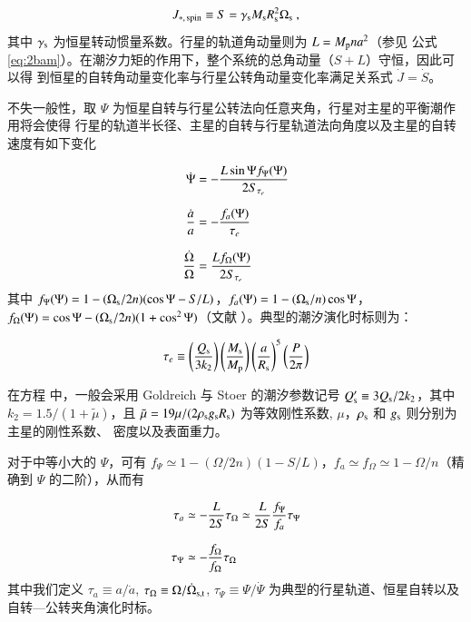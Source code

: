 \begin{equation} \label{eq:spinam}
J_{*,\,\mathrm{spin}} \equiv S = \gamma_\mathrm{s} M_\mathrm{s} R_\mathrm{s}^2 \Omega_\mathrm{s} \ ,
\end{equation} %
其中 $\gamma_\mathrm{s}$ 为恒星转动惯量系数。行星的轨道角动量则为 $L = M_\mathrm{p}na^2$（参见
公式 \ref{eq:2bam}）。在潮汐力矩的作用下，整个系统的总角动量（$S+L$）守恒，因此可以得
到恒星的自转角动量变化率与行星公转角动量变化率满足关系式 $\dot{J} = \dot{S}$。

不失一般性，取 $\Psi$ 为恒星自转与行星公转法向任意夹角，行星对主星的平衡潮作用将会使得
行星的轨道半长径、主星的自转与行星轨道法向角度以及主星的自转速度有如下变化

\begin{subequations} \label{eq:tidalevo}
\setlength{\jot}{10pt}
\begin{align}
   \dot{\Psi} &= - \frac{L\sin \Psi f_\Psi(\Psi)}{2S_{\tau_e}}     \label{eq:obevo} \\
    \frac{\dot{a}}{a} &= - \frac{f_a(\Psi)}{\tau_e}   \label{eq:smaevo}  \\
    \frac{\dot{\Omega}}{\Omega} & = \frac{Lf_\Omega(\Psi)}{2S_{\tau_e}} \label{eq:spinevo}
\end{align}
\end{subequations} %
其中 $f_\Psi(\Psi) = 1 - (\Omega_\mathrm{s}/2n)(\cos\Psi - S/L)$，$f_a(\Psi) = 1 - (\Omega_\mathrm{s}/n)\cos\Psi$，
$f_\Omega(\Psi) = \cos\Psi - (\Omega_\mathrm{s}/2n)(1+ \cos^2\Psi)$（文献 ）。典型的潮汐演化时标则为：

\begin{equation} \label{eq:taue}
\tau_e \equiv \left( {Q_\mathrm{s} \over 3 k_2} \right) \left( {M_\mathrm{s} \over M_\mathrm{p}}\right)
\left( {a \over R_\mathrm{s}}\right)^5 \left( {P \over 2 \pi} \right) 
\end{equation} %

在方程 \label{eq:taue} 中，一般会采用 Goldreich 与 Stoer 的潮汐参数记号 $Q_\mathrm{s}^\prime \equiv 3 
Q_\mathrm{s}/2k_2$，其中 $k_2 =1.5/(1+{\tilde \mu})$，且 ${\tilde \mu} = 19 \mu/(2 \rho_\mathrm{s} 
g_\mathrm{s} R_\mathrm{s})$ 为等效刚性系数, $\mu$，$\rho_\mathrm{s}$ 和 $g_\mathrm{s}$ 则分别为主星的刚性系数、
密度以及表面重力。

对于中等小大的 $\Psi$，可有 $f_\Psi \simeq 1 - (\Omega/2n) (1-S/L)$，$f_a \simeq f_\Omega \simeq 1
 - \Omega/n$（精确到 $\Psi$ 的二阶），从而有
 
\begin{subequations} \label{eq:ttimescale}
\setlength{\jot}{10pt}
\begin{align}
    \tau_a &\simeq - \frac{L}{2S}\tau_\Omega \simeq \frac{L}{2S} \frac{f_\Psi}{f_a} \tau_\Psi \\
    \tau_\Psi &\simeq -\frac{f_\Omega}{f_\Omega} \tau_\Omega 
\end{align}
\end{subequations} %
其中我们定义 $\tau_a \equiv a /{\dot a}$,  $\tau_\Omega \equiv \Omega / {\dot \Omega}_{\mathrm{s, t}}$, 
$\tau_\Psi \equiv \Psi / {\dot \Psi}$ 为典型的行星轨道、恒星自转以及自转---公转夹角演化时标。

